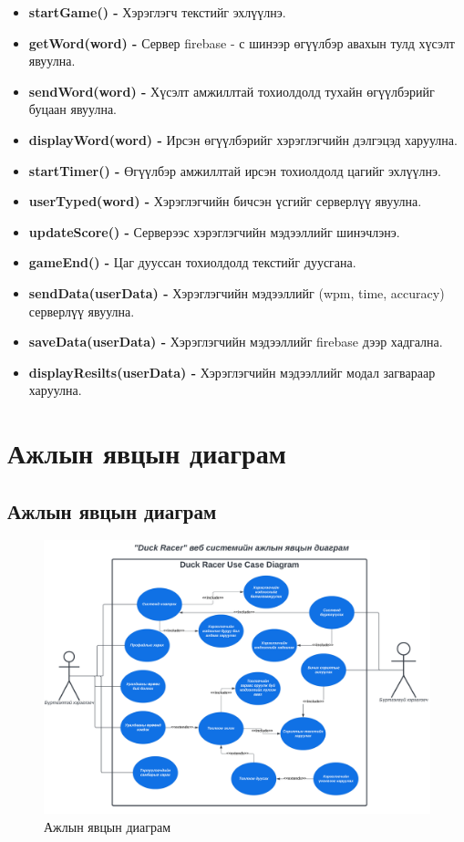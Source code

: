 \begin{itemize}
	\item \textbf{startGame() -} Хэрэглэгч текстийг эхлүүлнэ.
	\item \textbf{getWord(word) -} Сервер firebase - с шинээр өгүүлбэр авахын тулд хүсэлт явуулна.
	\item \textbf{sendWord(word) -} Хүсэлт амжиллтай тохиолдолд тухайн өгүүлбэрийг буцаан явуулна.
	\item \textbf{displayWord(word) -} Ирсэн өгүүлбэрийг хэрэглэгчийн дэлгэцэд харуулна. 
	\item \textbf{startTimer() -} Өгүүлбэр амжиллтай ирсэн тохиолдолд цагийг эхлүүлнэ. 
	\item \textbf{userTyped(word) -} Хэрэглэгчийн бичсэн үсгийг серверлүү явуулна.
	\item \textbf{updateScore() -} Серверээс хэрэглэгчийн мэдээллийг шинэчлэнэ.
	\item \textbf{gameEnd() -} Цаг дууссан тохиолдолд текстийг дуусгана.
	\item \textbf{sendData(userData) -}  Хэрэглэгчийн мэдээллийг (wpm, time, accuracy) серверлүү явуулна. 
	\item \textbf{saveData(userData) -} Хэрэглэгчийн мэдээллийг firebase дээр хадгална.
	\item \textbf{displayResilts(userData) -} Хэрэглэгчийн мэдээллийг модал загвараар харуулна.
\end{itemize}

\pagebreak

\section{Ажлын явцын диаграм}

\subsection{Ажлын явцын диаграм}
\begin{figure}[h]
	\centering
	\includegraphics[width=15cm]{images/usecase.png}
	\caption{Ажлын явцын диаграм}
	\label{fig:usecase}
\end{figure}

